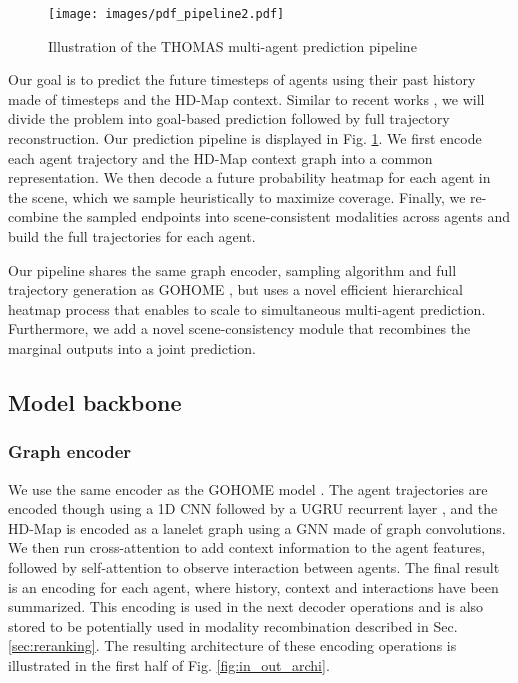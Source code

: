 \documentclass{article} \usepackage{iclr2022_conference,times}
\begin{document}
\begin{figure}[t]
\centerline{\texttt{[image: images/pdf\_pipeline2.pdf]}}
\caption{Illustration of the THOMAS multi-agent prediction pipeline}
\label{fig:pipeline}
\end{figure}
Our goal is to predict the future  timesteps of  agents using their past history made of  timesteps and the HD-Map context. Similar to recent works \citep{zhao2020tnt, zeng2021lanercnn, gu2021densetnt}, we will divide the problem into goal-based prediction followed by full trajectory reconstruction. Our prediction pipeline is displayed in Fig. \ref{fig:pipeline}. We first encode each agent trajectory and the HD-Map context graph into a common representation. We then decode a future probability heatmap for each agent in the scene, which we sample heuristically to maximize coverage. Finally, we re-combine the sampled endpoints into scene-consistent modalities across agents and build the full trajectories for each agent. 

Our pipeline shares the same graph encoder, sampling algorithm and full trajectory generation as GOHOME \citep{gilles2021gohome}, but uses a novel efficient hierarchical heatmap process that enables to scale to simultaneous multi-agent prediction. Furthermore, we add a novel scene-consistency module that recombines the marginal outputs into a joint prediction.
\subsection{Model backbone}






\subsubsection{Graph encoder}
\label{sec:graph_encoder}

We use the same encoder as the GOHOME model \citep{gilles2021gohome}. The agent trajectories are encoded though  using a 1D CNN followed by a UGRU recurrent layer \citep{rozenberg2021asymmetrical}, and the HD-Map is encoded as a lanelet graph using a GNN  made of graph convolutions. 
We then run cross-attention  to add context information to the agent features, followed by self-attention  to observe interaction between agents. The final result is an encoding  for each agent, where history, context and interactions have been summarized. This encoding  is used in the next decoder operations and is also stored to be potentially used in modality recombination described in Sec. \ref{sec:reranking}. The resulting architecture of these encoding operations is illustrated in the first half of Fig. \ref{fig:in_out_archi}.
\end{document}
